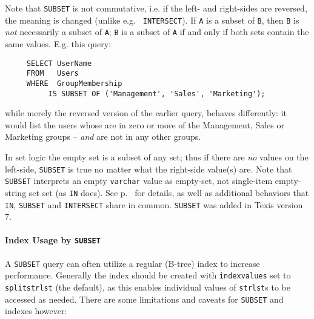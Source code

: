 Note that {\tt SUBSET} is not commutative, i.e. if the left- and
right-sides are reversed, the meaning is changed (unlike e.g. {\tt
INTERSECT}).  If \verb`A` is a subset of \verb`B`, then \verb`B` is
{\em not} necessarily a subset of \verb`A`; \verb`B` is a subset of
\verb`A` if and only if both sets contain the same values.  E.g. this
query:

\begin{verbatim}
     SELECT UserName
     FROM   Users
     WHERE  GroupMembership
          IS SUBSET OF ('Management', 'Sales', 'Marketing');
\end{verbatim}

while merely the reversed version of the earlier query, behaves
differently: it would list the users whose are in zero or more of the
Management, Sales or Marketing groups -- {\em and} are not in any
other groups.

In set logic the empty set is a subset of any set; thus if there are
{\em no} values on the left-side, {\tt SUBSET} is true no matter what
the right-side value(s) are.  Note that {\tt SUBSET} interprets an
empty {\tt varchar} value as empty-set, not single-item empty-string
set set (as {\tt IN} does).  See
p.~\pageref{InSubsetIntersectCommonality} for details, as well as
additional behaviors that {\tt IN}, {\tt SUBSET} and {\tt INTERSECT}
share in common.  {\tt SUBSET} was added in Texis version 7.

\paragraph{Index Usage by {\tt SUBSET}}
\label{SubsetIndexUsage}

  A {\tt SUBSET} query can often utilize a regular (B-tree) index to
increase performance.  Generally the index should be created with
\verb`indexvalues` set to \verb`splitstrlst` (the default), as this
enables individual values of \verb`strlst`s to be accessed as needed.
There are some limitations and caveats for {\tt SUBSET} and indexes
however:

